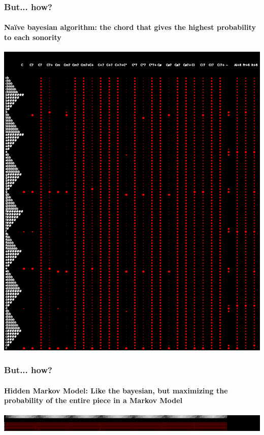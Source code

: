 \documentclass{beamer}
\begin{document}
\begin{frame}
  \frametitle{But... how?}
  \framesubtitle{Naïve bayesian algorithm: the chord that gives the highest
    probability to each sonority}
  \includegraphics[scale=0.4, trim = 6em 0 0 0]{figs/notesprobs}
\end{frame}

\begin{frame}
  \frametitle{But... how?}
  \framesubtitle{Hidden Markov Model: Like the bayesian, but
    maximizing the probability of the entire piece in a Markov Model}
  \includegraphics[scale=0.4, trim = 6em 0 0 0]{figs/transprobs}
\end{frame}
\end{document}
